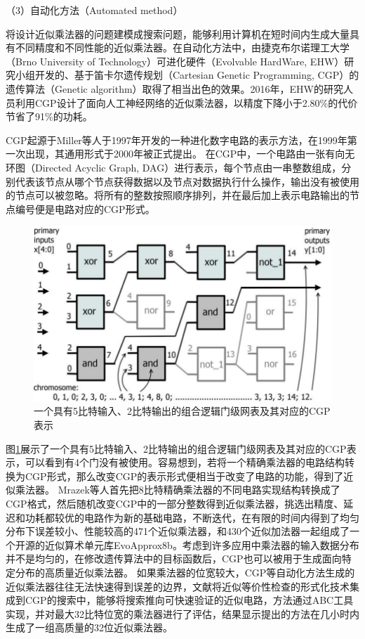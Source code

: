 （3）自动化方法（Automated method）

将设计近似乘法器的问题建模成搜索问题，能够利用计算机在短时间内生成大量具有不同精度和不同性能的近似乘法器。在自动化方法中，由捷克布尔诺理工大学（Brno University of Technology）可进化硬件（Evolvable HardWare, EHW）研究小组开发的、基于笛卡尔遗传规划（Cartesian Genetic Programming, CGP）\cite{CGP_2008,CGP_2011}的遗传算法（Genetic algorithm）取得了相当出色的效果。2016年，EHW的研究人员利用CGP设计了面向人工神经网络的近似乘法器\cite{AC:AM:CGP_2016}，以精度下降小于2.80\%的代价节省了91\%的功耗。

CGP起源于Miller等人于1997年开发的一种进化数字电路的表示方法\cite{CGP_1997}，在1999年第一次出现\cite{CGP_1999}，其通用形式于2000年被正式提出\cite{CGP_2000}。
在CGP中，一个电路由一张有向无环图（Directed Acyclic Graph, DAG）进行表示，每个节点由一串整数组成，分别代表该节点从哪个节点获得数据以及节点对数据执行什么操作，输出没有被使用的节点可以被忽略。将所有的整数按照顺序排列，并在最后加上表示电路输出的节点编号便是电路对应的CGP形式。
\begin{figure}[!htb]
    \centering
    \includegraphics[width=0.8\linewidth]{figs/AC-AM-CGP.png}
    \caption{一个具有5比特输入、2比特输出的组合逻辑门级网表及其对应的CGP表示}
\label{AC:AM:CGP}
\end{figure}
图\ref{AC:AM:CGP}展示了一个具有5比特输入、2比特输出的组合逻辑门级网表及其对应的CGP表示，可以看到有4个门没有被使用。容易想到，若将一个精确乘法器的电路结构转换为CGP形式，那么改变CGP的表示形式便相当于改变了电路的功能，得到了近似乘法器。
Mrazek等人首先把8比特精确乘法器的不同电路实现结构转换成了CGP格式，然后随机改变CGP中的一部分整数得到近似乘法器，挑选出精度、延迟和功耗都较优的电路作为新的基础电路，不断迭代，在有限的时间内得到了均匀分布下误差较小、性能较高的471个近似乘法器，和430个近似加法器一起组成了一个开源的近似算术单元库EvoApprox8b\cite{AC:AM:CGP_Evoapprox8b}。考虑到许多应用中乘法器的输入数据分布并不是均匀的，在修改遗传算法中的目标函数后，CGP也可以被用于生成面向特定分布的高质量近似乘法器\cite{AC:AM:CGP_2019}。
如果乘法器的位宽较大，CGP等自动化方法生成的近似乘法器往往无法快速得到误差的边界，文献\cite{AC:AM:CGP_32bit}将近似等价性检查的形式化技术集成到CGP的搜索中，能够将搜索推向可快速验证的近似电路，方法通过ABC\cite{LS:ABC}工具实现，并对最大32比特位宽的乘法器进行了评估，结果显示提出的方法在几小时内生成了一组高质量的32位近似乘法器。

